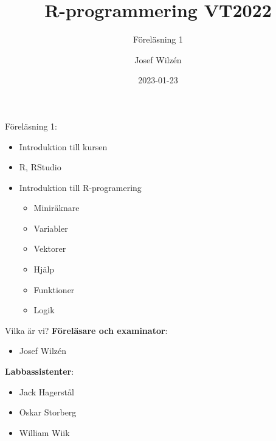 \documentclass[
  10pt,
  ignorenonframetext,
]{beamer}
\title{R-programmering VT2022}
\subtitle{Föreläsning 1}
\author{Josef Wilzén}
\date{2023-01-23}
\institute{Linköpings Universitet}
\providecommand{\tightlist}{%
  \setlength{\itemsep}{0pt}\setlength{\parskip}{0pt}}
\begin{document}
\frame{\titlepage}


\begin{frame}{Föreläsning 1:}
\protect\hypertarget{fuxf6reluxe4sning-1}{}
\begin{itemize}
\tightlist
\item
  Introduktion till kursen
\item
  R, RStudio
\item
  Introduktion till R-programering

  \begin{itemize}
  \tightlist
  \item
    Miniräknare
  \item
    Variabler
  \item
    Vektorer
  \item
    Hjälp
  \item
    Funktioner
  \item
    Logik
  \end{itemize}
\end{itemize}
\end{frame}



\begin{frame}{Vilka är vi?}
\protect\hypertarget{vilka-uxe4r-vi}{}
\textbf{Föreläsare och examinator}:

\begin{itemize}
\tightlist
\item
  Josef Wilzén
\end{itemize}

\textbf{Labbassistenter}:

\begin{itemize}
\tightlist
\item
  Jack Hagerstål
\item
  Oskar Storberg
\item
  William Wiik
\end{itemize}
\end{frame}

\end{document}

